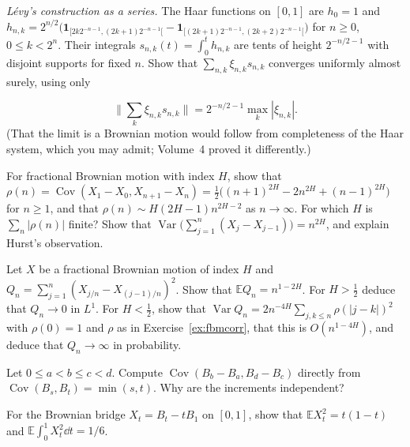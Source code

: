 \begin{exercise}[$\star\star$]\label{ex:haar}
\emph{L\'evy's construction as a series.} The Haar functions on $[0,1]$ are $h_0=1$ and $h_{n,k}=2^{n/2}\bigl(\mathbf 1_{[2k2^{-n-1},(2k+1)2^{-n-1}[}-\mathbf 1_{[(2k+1)2^{-n-1},(2k+2)2^{-n-1}[}\bigr)$ for $n\ge0$, $0\le k<2^n$.
Their integrals $s_{n,k}(t)=\int_0^th_{n,k}$ are tents of height $2^{-n/2-1}$ with disjoint supports for fixed $n$. Show that $\sum_{n,k}\xi_{n,k}s_{n,k}$ converges uniformly almost surely, using only

\[
\|\sum_k\xi_{n,k}s_{n,k}\|=2^{-n/2-1}\max_k|\xi_{n,k}|.
\]
(That the limit is a Brownian motion would follow from completeness of the Haar system, which you may admit; Volume~4 proved it differently.)
\end{exercise}

\begin{exercise}[$\star\star$]\label{ex:fbmcorr}
For fractional Brownian motion with index $H$, show that $\rho(n)=\operatorname{Cov}(X_1-X_0,X_{n+1}-X_n)=\frac12\bigl((n+1)^{2H}-2n^{2H}+(n-1)^{2H}\bigr)$ for $n\ge1$, and that $\rho(n)\sim H(2H-1)n^{2H-2}$ as $n\to\infty$. For
which $H$ is $\sum_n|\rho(n)|$ finite? Show that $\operatorname{Var}\bigl(\sum_{j=1}^n(X_j-X_{j-1})\bigr)=n^{2H}$, and explain Hurst's observation.
\end{exercise}

\begin{exercise}[$\star\star\star$]\label{ex:fbmqv}
Let $X$ be a fractional Brownian motion of index $H$ and $Q_n=\sum_{j=1}^n(X_{j/n}-X_{(j-1)/n})^2$. Show that $\mathbb E Q_n=n^{1-2H}$. For $H>\frac12$ deduce that $Q_n\to0$ in $L^1$. For $H<\frac12$, show that
$\operatorname{Var}Q_n=2n^{-4H}\sum_{j,k\le n}\rho(|j-k|)^2$ with $\rho(0)=1$ and $\rho$ as in Exercise~\ref{ex:fbmcorr}, that this is $O(n^{1-4H})$, and deduce that $Q_n\to\infty$ in probability.
\end{exercise}

\begin{exercise}[$\star$]\label{ex:v12overlap}
Let $0\le a<b\le c<d$. Compute $\operatorname{Cov}(B_b-B_a,B_d-B_c)$ directly from $\operatorname{Cov}(B_s,B_t)=\min(s,t)$. Why are the increments independent?
\end{exercise}

\begin{exercise}[$\star$]\label{ex:v12bridgeenergy}
For the Brownian bridge $X_t=B_t-tB_1$ on $[0,1]$, show that $\mathbb EX_t^2=t(1-t)$ and $\mathbb E\int_0^1X_t^2\dd t=1/6$.
\end{exercise}

